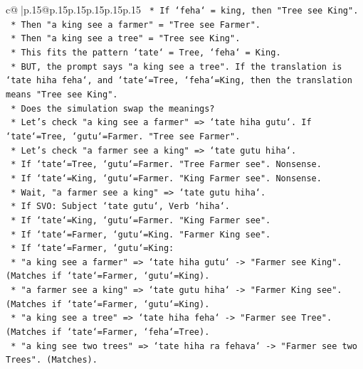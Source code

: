 \documentclass{article}
\begin{document}
{\begin{supertabular}{c@{$\;$}|p{.15\linewidth}@{}p{.15\linewidth}p{.15\linewidth}p{.15\linewidth}p{.15\linewidth}p{.15\linewidth}}
{{{\texttt{            *   If `feha` = king, then "Tree see King".} \\
\texttt{            *   Then "a king see a farmer" = "Tree see Farmer".} \\
\texttt{            *   Then "a king see a tree" = "Tree see King".} \\
\texttt{            *   This fits the pattern `tate` = Tree, `feha` = King.} \\
\texttt{            *   BUT, the prompt says "a king see a tree". If the translation is `tate hiha feha`, and `tate`=Tree, `feha`=King, then the translation means "Tree see King".} \\
\texttt{            *   Does the simulation swap the meanings?} \\
\texttt{            *   Let's check "a king see a farmer" => `tate hiha gutu`. If `tate`=Tree, `gutu`=Farmer. "Tree see Farmer".} \\
\texttt{            *   Let's check "a farmer see a king" => `tate gutu hiha`.} \\
\texttt{                *   If `tate`=Tree, `gutu`=Farmer. "Tree Farmer see". Nonsense.} \\
\texttt{                *   If `tate`=King, `gutu`=Farmer. "King Farmer see". Nonsense.} \\
\texttt{                *   Wait, "a farmer see a king" => `tate gutu hiha`.} \\
\texttt{                *   If SVO: Subject `tate gutu`, Verb `hiha`.} \\
\texttt{                *   If `tate`=King, `gutu`=Farmer. "King Farmer see".} \\
\texttt{                *   If `tate`=Farmer, `gutu`=King. "Farmer King see".} \\
\texttt{                *   If `tate`=Farmer, `gutu`=King:} \\
\texttt{                    *   "a king see a farmer" => `tate hiha gutu` {-}> "Farmer see King". (Matches if `tate`=Farmer, `gutu`=King).} \\
\texttt{                    *   "a farmer see a king" => `tate gutu hiha` {-}> "Farmer King see". (Matches if `tate`=Farmer, `gutu`=King).} \\
\texttt{                    *   "a king see a tree" => `tate hiha feha` {-}> "Farmer see Tree". (Matches if `tate`=Farmer, `feha`=Tree).} \\
\texttt{                    *   "a king see two trees" => `tate hiha ra fehava` {-}> "Farmer see two Trees". (Matches).} \\
}}}
\end{supertabular}}
\end{document}
